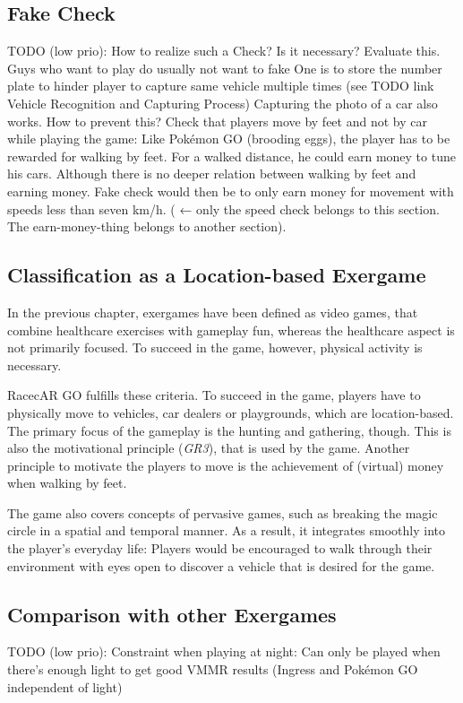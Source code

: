 \subsection{Fake Check}
TODO (low prio):
How to realize such a Check?
Is it necessary? Evaluate this. Guys who want to play do usually not want to fake
One is to store the number plate to hinder player to capture same vehicle multiple times (see TODO link Vehicle Recognition and Capturing Process)
Capturing the photo of a car also works. How to prevent this?
Check that players move by feet and not by car while playing the game: Like Pok\'{e}mon GO (brooding eggs), the player has to be rewarded for walking by feet. For a walked distance, he could earn money to tune his cars. Although there is no deeper relation between walking by feet and earning money. Fake check would then be to only earn money for movement with speeds less than seven km/h. ( ← only the speed check belongs to this section. The earn-money-thing belongs to another section).

\subsection{Classification as a Location-based Exergame}
In the previous chapter, exergames have been defined as video games, that combine healthcare exercises with gameplay fun, whereas the healthcare aspect is not primarily focused. To succeed in the game, however, physical activity is necessary.

RacecAR GO fulfills these criteria. To succeed in the game, players have to physically move to vehicles, car dealers or playgrounds, which are location-based. The primary focus of the gameplay is the hunting and gathering, though. This is also the motivational principle (\emph{GR3}), that is used by the game. Another principle to motivate the players to move is the achievement of (virtual) money when walking by feet.

The game also covers concepts of pervasive games, such as breaking the magic circle in a spatial and temporal manner. As a result, it integrates smoothly into the player's everyday life: Players would be encouraged to walk through their environment with eyes open to discover a vehicle that is desired for the game.

\subsection{Comparison with other Exergames}
TODO (low prio):
Constraint when playing at night: Can only be played when there's enough light to get good VMMR results (Ingress and Pok\'{e}mon GO independent of light)

